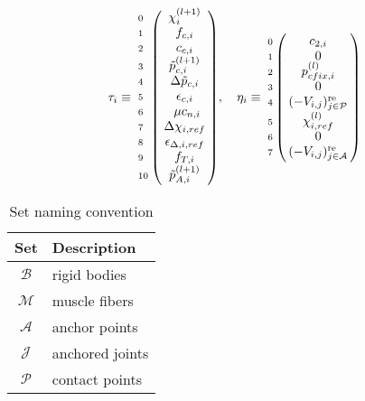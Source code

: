 \documentclass[a4paper,10pt]{article}
\begin{document}
\begin{equation}\notag
\tau_i \equiv
\bordermatrix {
                &                                     \cr
\scriptstyle{0} &  \chi^{(l+1)}_i                     \cr
\scriptstyle{1} &   f_{c,i}                           \cr
\scriptstyle{2} &   c_{c,i}                           \cr
\scriptstyle{3} &   \tilde{p}^{(l+1)}_{c,i}           \cr
\scriptstyle{4} &   \Delta \tilde{p}_{c,i}            \cr
\scriptstyle{5} &   \epsilon_{c,i}                    \cr
\scriptstyle{6} &   \\ \mu c_{n,i}                    \cr
\scriptstyle{7} &   \Delta\chi_{i,ref}                \cr
\scriptstyle{8} &   \epsilon_{\Delta,i,ref}           \cr
\scriptstyle{9} &   f_{T,i}                           \cr
\scriptstyle{10}&   \tilde{p}^{(l+1)}_{A,i}
}
, \quad
\eta_i \equiv
\bordermatrix {
                &                                              \cr
\scriptstyle{0} &   c_{2,i}                                    \cr
\scriptstyle{1} &   0                                          \cr
\scriptstyle{2} &   p_{cfix, i}^{(l)}                          \cr
\scriptstyle{3} &   0                                          \cr
\scriptstyle{4} &   (-V_{i,j})_{j \in \mathcal{P}}^\text{re}   \cr
\scriptstyle{5} &   \chi^{(l)}_{i,ref}                         \cr
\scriptstyle{6} &   0                                          \cr
\scriptstyle{7} &   (-V_{i,j})_{j \in \mathcal{A}}^\text{re}   
}
\end{equation}

\begin{table}[h!b!p!]
\caption{Set naming convention}
\centering
\begin{tabular}{ c l }
\hline
Set              & Description                  \\
\hline
$\mathcal{B}$    & rigid bodies                 \\
$\mathcal{M}$    & muscle fibers                \\
$\mathcal{A}$    & anchor points                \\ 
$\mathcal{J}$    & anchored joints              \\
$\mathcal{P}$    & contact points               \\
\hline
\end{tabular}
\end{table}

\pagebreak





\end{document}
